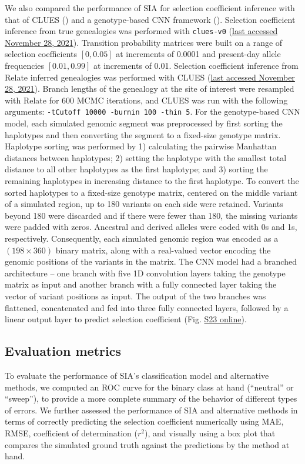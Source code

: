 We also compared the performance of \ac{SIA} for selection coefficient inference with that of CLUES (\cite{stern_approximate_2019}) and a genotype-based \ac{CNN} framework (\cite{flagel_unreasonable_2019,torada_imagene_2019}). Selection coefficient inference from true genealogies was performed with \texttt{clues-v0} (\href{https://github.com/35ajstern/clues-v0}{last accessed November 28, 2021}). Transition probability matrices were built on a range of selection coefficients $[0, 0.05]$ at increments of 0.0001 and present-day allele frequencies $[0.01, 0.99]$ at increments of 0.01. Selection coefficient inference from Relate inferred genealogies was performed with CLUES (\href{https://github.com/35ajstern/clues}{last accessed November 28, 2021}). Branch lengths of the genealogy at the site of interest were resampled with Relate for 600 \acs{MCMC} iterations, and CLUES was run with the following arguments: \texttt{-tCutoff 10000 -burnin 100 -thin 5}. For the genotype-based \ac{CNN} model, each simulated genomic segment was preprocessed by first sorting the haplotypes and then converting the segment to a fixed-size genotype matrix. Haplotype sorting was performed by 1) calculating the pairwise Manhattan distances between haplotypes; 2) setting the haplotype with the smallest total distance to all other haplotypes as the first haplotype; and 3) sorting the remaining haplotypes in increasing distance to the first haplotype. To convert the sorted haplotypes to a fixed-size genotype matrix, centered on the middle variant of a simulated region, up to 180 variants on each side were retained. Variants beyond 180 were discarded and if there were fewer than 180, the missing variants were padded with zeros. Ancestral and derived alleles were coded with 0s and 1s, respectively. Consequently, each simulated genomic region was encoded as a $(198 \times 360)$ binary matrix, along with a real-valued vector encoding the genomic positions of the variants in the matrix. The \ac{CNN} model had a branched architecture -- one branch with five 1D convolution layers taking the genotype matrix as input and another branch with a fully connected layer taking the vector of variant positions as input. The output of the two branches was flattened, concatenated and fed into three fully connected layers, followed by a linear output layer to predict selection coefficient (Fig. \href{https://academic.oup.com/mbe/article/39/1/msab332/6433161?login=true#supplementary-data}{S23 online}).

\subsection{Evaluation metrics}
To evaluate the performance of \ac{SIA}’s classification model and alternative methods, we computed an \ac{ROC} curve for the binary class at hand (“neutral” or “sweep”), to provide a more complete summary of the behavior of different types of errors. We further assessed the performance of \ac{SIA} and alternative methods in terms of correctly predicting the selection coefficient numerically using \acf{MAE}, \acf{RMSE}, coefficient of determination ($r^2$), and visually using a box plot that compares the simulated ground truth against the predictions by the method at hand.

